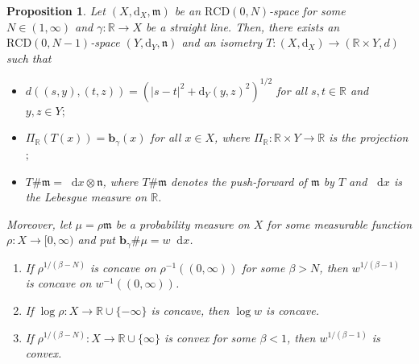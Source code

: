 \documentclass[sts]{imsart}
\newtheorem{proposition}[theorem]{Proposition}
\theoremstyle{definition}
\theoremstyle{remark}
\newcommand{\R}{\mathbb{R}}
\newcommand{\bb}{\mathbf{b}}
\newcommand{\fm}{\mathfrak{m}}
\newcommand{\fn}{\mathfrak{n}}
\newcommand{\dist}{\mathrm{d}}
\newcommand{\lra}{\longrightarrow}
\newcommand{\e}{\mathrm{e}}
\newcommand{\RCD}{\mathrm{RCD}}
\newcommand*\diff{\mathop{}\!\mathrm{d}}
\begin{document}
\begin{proposition}\label{pr:proj}
Let $(X,\dist_X,\fm)$ be an $\RCD(0,N)$-space for some $N\in (1,\infty)$ and $\gamma\colon \R \lra X$ be a straight line.
Then, there exists an $\RCD(0,N-1)$-space $(Y,\dist_Y,\fn)$ and an isometry $T\colon (X,\dist_X) \lra (\R\times Y,d)$ such that
\begin{itemize}
    \item $d((s,y),(t,z))=\left(|s-t|^2+\dist_Y(y,z)^2\right)^{1/2}$ for all $s,t\in\R$ and $y,z\in Y;$
    \item $\Pi_{\R}(T(x))=\bb_\gamma(x)$ for all $x \in X$, where $\Pi_{\R}\colon \R \times Y \lra \R$ is the projection$;$
    \item $T\#\fm=\diff x\otimes \fn$, where $T\#\fm$ denotes the push-forward of $\fm$ by $T$ and $\diff x$ is the Lebesgue measure on $\R$.
\end{itemize}
Moreover, let $\mu=\rho\fm$ be a probability measure on $X$ for some measurable function $\rho\colon X \lra [0,\infty)$ and put $\bb_\gamma\#\mu=w\diff x$.
\begin{enumerate}[{\rm (i)}]
\item\label{key_pos}
If $\rho^{1/(\beta-N)}$ is concave on $\rho^{-1}((0,\infty))$ for some $\beta>N$, then $w^{1/(\beta-1)}$ is concave on $w^{-1}((0,\infty))$.
\item\label{key_inf}
If $\log\rho\colon X \lra \R \cup \{-\infty\}$ is concave, then $\log w$ is concave.
\item\label{key_neg}
If $\rho^{1/(\beta-N)}\colon X \lra \R \cup \{\infty\}$ is convex for some $\beta<1$, then $w^{1/(\beta-1)}$ is convex.
\end{enumerate}
\end{proposition}
\end{document}
